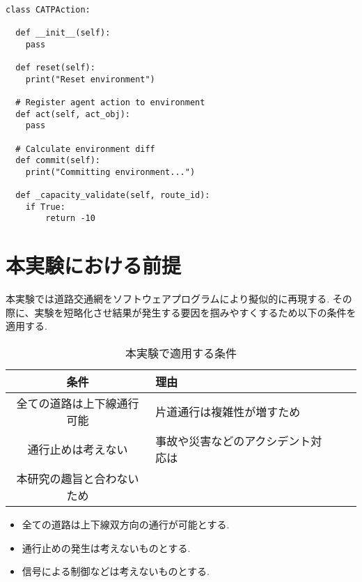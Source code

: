 \begin{lstlisting}[caption = 行動を定義するクラス, label = program1]

class CATPAction:

  def __init__(self):
    pass

  def reset(self):
    print("Reset environment")

  # Register agent action to environment
  def act(self, act_obj):
    pass

  # Calculate environment diff
  def commit(self):
    print("Committing environment...")

  def _capacity_validate(self, route_id):  
    if True:
        return -10  
\end{lstlisting}
  
  



\section{本実験における前提}

本実験では道路交通網をソフトウェアプログラムにより擬似的に再現する. その際に、実験を短略化させ結果が発生する要因を掴みやすくするため以下の条件を適用する.


\begin{table}[h]
  \caption{本実験で適用する条件}
  \label{table:SpeedOfLight}
  \centering
  \begin{tabular}{clll}
    \hline
      条件 & 理由 \\
      \hline \hline
      全ての道路は上下線通行可能 & 片道通行は複雑性が増すため  \\
      通行止めは考えない & 事故や災害などのアクシデント対応は \\ 本研究の趣旨と合わないため \\
    \hline
  \end{tabular}
\end{table}



\begin{itemize}
  \item 全ての道路は上下線双方向の通行が可能とする.
  \item 通行止めの発生は考えないものとする.
  \item 信号による制御などは考えないものとする.
\end{itemize}

